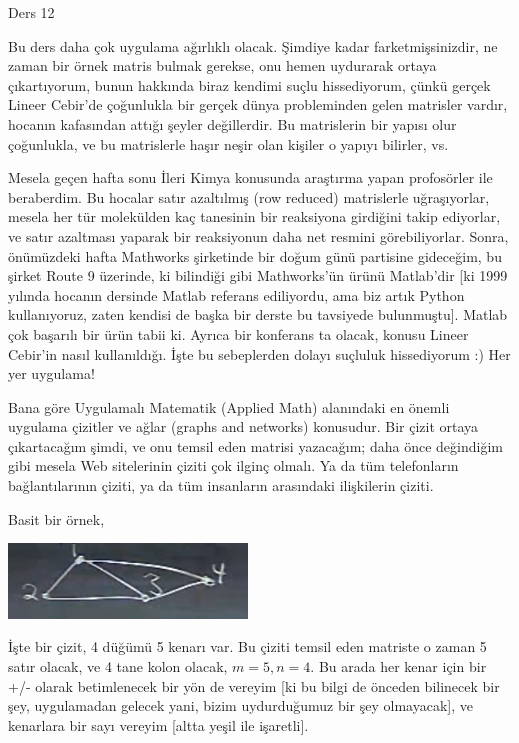 \documentclass[12pt,fleqn]{article}\usepackage{../../common}
\begin{document}
Ders 12

Bu ders daha çok uygulama ağırlıklı olacak. Şimdiye kadar
farketmişsinizdir, ne zaman bir örnek matris bulmak gerekse, onu hemen
uydurarak ortaya çıkartıyorum, bunun hakkında biraz kendimi suçlu
hissediyorum, çünkü gerçek Lineer Cebir'de çoğunlukla bir gerçek dünya
probleminden gelen matrisler vardır, hocanın kafasından attığı şeyler
değillerdir. Bu matrislerin bir yapısı olur çoğunlukla, ve bu matrislerle
haşır neşir olan kişiler o yapıyı bilirler, vs.

Mesela geçen hafta sonu İleri Kimya konusunda araştırma yapan profosörler
ile beraberdim. Bu hocalar satır azaltılmış (row reduced) matrislerle
uğraşıyorlar, mesela her tür molekülden kaç tanesinin bir reaksiyona
girdiğini takip ediyorlar, ve satır azaltması yaparak bir reaksiyonun
daha net resmini görebiliyorlar. Sonra, önümüzdeki hafta Mathworks
şirketinde bir doğum günü partisine gideceğim, bu şirket Route 9 üzerinde,
ki bilindiği gibi Mathworks'ün ürünü Matlab'dir [ki 1999 yılında hocanın
dersinde Matlab referans ediliyordu, ama biz artık Python kullanıyoruz,
zaten kendisi de başka bir derste bu tavsiyede bulunmuştu]. Matlab çok
başarılı bir ürün tabii ki. Ayrıca bir konferans ta olacak, konusu Lineer
Cebir'in nasıl kullanıldığı. İşte bu sebeplerden dolayı suçluluk
hissediyorum :) Her yer uygulama! 

Bana göre Uygulamalı Matematik (Applied Math) alanındaki en önemli uygulama
çizitler ve ağlar (graphs and networks) konusudur. Bir çizit ortaya
çıkartacağım şimdi, ve onu temsil eden matrisi yazacağım; daha önce
değindiğim gibi mesela Web sitelerinin çiziti çok ilginç olmalı. Ya da tüm
telefonların bağlantılarının çiziti, ya da tüm insanların arasındaki
ilişkilerin çiziti. 

Basit bir örnek,

\includegraphics[height=2cm]{12_1.png}

İşte bir çizit, 4 düğümü 5 kenarı var. Bu çiziti temsil eden matriste o
zaman 5 satır olacak, ve 4 tane kolon olacak, $m=5,n=4$. Bu arada her kenar
için bir +/- olarak betimlenecek bir yön de vereyim [ki bu bilgi de önceden
bilinecek bir şey, uygulamadan gelecek yani, bizim uydurduğumuz bir şey
olmayacak], ve kenarlara bir sayı vereyim [altta yeşil ile işaretli].
\end{document}
